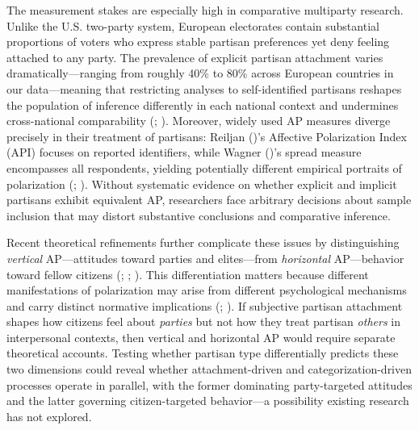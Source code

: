 \documentclass[
  12pt,
  a4paper,
  DIV=11,
  numbers=noendperiod]{scrartcl}
\begin{document}
The measurement stakes are especially high in comparative multiparty
research. Unlike the U.S. two-party system, European electorates contain
substantial proportions of voters who express stable partisan
preferences yet deny feeling attached to any party. The prevalence of
explicit partisan attachment varies dramatically---ranging from roughly
40\% to 80\% across European countries in our data---meaning that
restricting analyses to self-identified partisans reshapes the
population of inference differently in each national context and
undermines cross-national comparability
(;
). Moreover, widely used AP measures diverge precisely in
their treatment of partisans: Reiljan
()'s Affective Polarization Index
(API) focuses on reported identifiers, while Wagner
()'s spread measure encompasses
all respondents, yielding potentially different empirical portraits of
polarization (;
). Without
systematic evidence on whether explicit and implicit partisans exhibit
equivalent AP, researchers face arbitrary decisions about sample
inclusion that may distort substantive conclusions and comparative
inference.

Recent theoretical refinements further complicate these issues by
distinguishing \emph{vertical} AP---attitudes toward parties and
elites---from \emph{horizontal} AP---behavior toward fellow citizens
(;
;
). This
differentiation matters because different manifestations of polarization
may arise from different psychological mechanisms and carry distinct
normative implications
(;
). If subjective
partisan attachment shapes how citizens feel about \emph{parties} but
not how they treat partisan \emph{others} in interpersonal contexts,
then vertical and horizontal AP would require separate theoretical
accounts. Testing whether partisan type differentially predicts these
two dimensions could reveal whether attachment-driven and
categorization-driven processes operate in parallel, with the former
dominating party-targeted attitudes and the latter governing
citizen-targeted behavior---a possibility existing research has not
explored.
\end{document}

